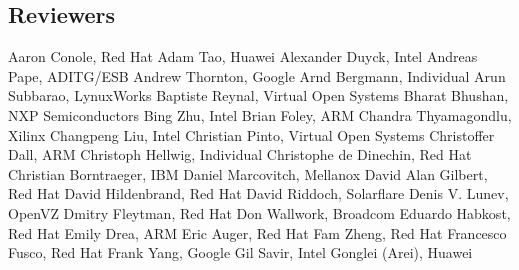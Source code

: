 \subsection*{Reviewers}
Aaron Conole,	Red Hat	\newline
Adam Tao,	Huawei	\newline
Alexander Duyck,	Intel	\newline
Andreas Pape,	ADITG/ESB	\newline
Andrew Thornton,  Google \newline
Arnd Bergmann, Individual \newline
Arun Subbarao,	LynuxWorks	\newline
Baptiste Reynal,	Virtual Open Systems	\newline
Bharat Bhushan,	NXP Semiconductors	\newline
Bing Zhu, Intel \newline
Brian Foley,  ARM \newline
Chandra Thyamagondlu,	Xilinx	\newline
Changpeng Liu,	Intel	\newline
Christian Pinto,	Virtual Open Systems	\newline
Christoffer Dall,	ARM	\newline
Christoph Hellwig,	Individual \newline
Christophe de Dinechin, Red Hat \newline
Christian Borntraeger,	IBM	\newline
Daniel Marcovitch,	Mellanox	\newline
David Alan Gilbert, Red Hat \newline
David Hildenbrand,	Red Hat	\newline
David Riddoch,	Solarflare	\newline
Denis V. Lunev,	OpenVZ	\newline
Dmitry Fleytman,	Red Hat	\newline
Don Wallwork,	Broadcom	\newline
Eduardo Habkost, Red Hat \newline
Emily Drea,	ARM	\newline
Eric Auger,	Red Hat	\newline
Fam Zheng, Red Hat	\newline
Francesco Fusco,	Red Hat	\newline
Frank Yang,	Google	\newline
Gil Savir,	Intel	\newline
Gonglei (Arei),	Huawei	\newline
